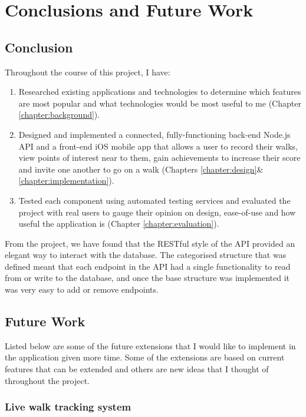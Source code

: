 \chapter{Conclusions and Future Work}

\section{Conclusion}

Throughout the course of this project, I have:

\begin{enumerate}
  \item Researched existing applications and technologies to determine which features are most popular and what technologies would be most useful to me (Chapter \ref{chapter:background}).
  \item Designed and implemented a connected, fully-functioning back-end Node.js API and a front-end iOS mobile app that allows a user to record their walks, view points of interest near to them, gain achievements to increase their score and invite one another to go on a walk (Chapters \ref{chapter:design}\&\ref{chapter:implementation}).
  \item Tested each component using automated testing services and evaluated the project with real users to gauge their opinion on design, ease-of-use and how useful the application is (Chapter \ref{chapter:evaluation}).
\end{enumerate}

From the project, we have found that the RESTful style of the API provided an elegant way to interact with the database. The categorised structure that was defined meant that each endpoint in the API had a single functionality to read from or write to the database, and once the base structure was implemented it was very easy to add or remove endpoints.

\section{Future Work} \label{section:future-work}

Listed below are some of the future extensions that I would like to implement in the application given more time. Some of the extensions are based on current features that can be extended and others are new ideas that I thought of throughout the project.

\subsection{Live walk tracking system}

